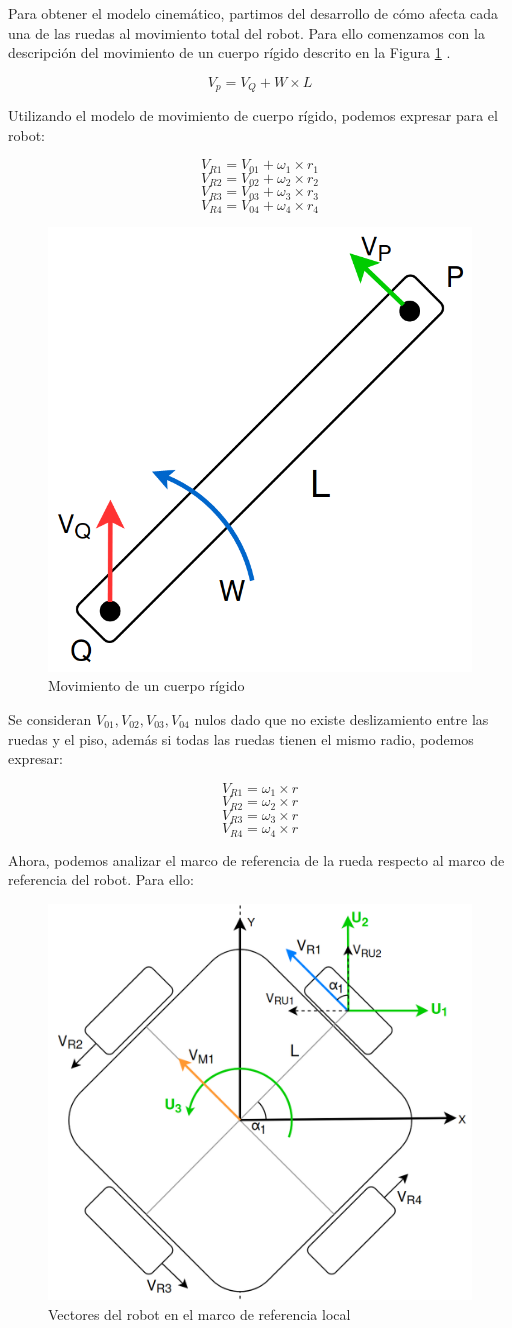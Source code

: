 Para obtener el modelo cinemático, partimos del desarrollo de cómo afecta cada una de las ruedas al movimiento total del robot. Para ello comenzamos con la descripción del movimiento de un cuerpo rígido descrito en la Figura \ref{fig:movimientocuerporigido} \cite{islassistcontrolomni}.

$$ V_p = V_Q + W \times L $$

Utilizando el modelo de movimiento de cuerpo rígido, podemos expresar para el robot:

$$ V_{R1} = V_{01} + \omega_1 \times r_1 $$
$$ V_{R2} = V_{02} + \omega_2 \times r_2 $$
$$ V_{R3} = V_{03} + \omega_3 \times r_3 $$
$$ V_{R4} = V_{04} + \omega_4 \times r_4 $$

\begin{figure}[H]
    \centering
    \includegraphics[width=0.3\linewidth]{images/movimiento_cuerpo_rigido.png}
    \caption{Movimiento de un cuerpo rígido}
    \label{fig:movimientocuerporigido}
\end{figure}

Se consideran $ V_{01}, V_{02}, V_{03}, V_{04} $ nulos dado que no existe deslizamiento entre las ruedas y el piso, además si todas las ruedas tienen el mismo radio, podemos expresar:

$$ V_{R1} = \omega_1 \times r $$
$$ V_{R2} = \omega_2 \times r $$
$$ V_{R3} = \omega_3 \times r $$
$$ V_{R4} = \omega_4 \times r $$

Ahora, podemos analizar el marco de referencia de la rueda respecto al marco de referencia del robot. Para ello:

\begin{figure}[H]
    \centering
    \includegraphics[width=0.6\linewidth]{images/modelo_cinematico_robot_vector.png}
    \caption{Vectores del robot en el marco de referencia local}
    \label{fig:robotmarcoreflocal}
\end{figure}

